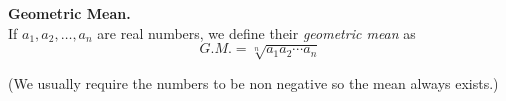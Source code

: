 \documentclass[12pt]{article}
\begin{document}
\textbf{Geometric Mean.}\\
If  $a_1,a_2,\ldots,a_n$ are real numbers, we define their \emph{geometric mean} as
$$G.M. =\sqrt[n]{a_1a_2\cdots a_n}$$
\bigskip

{\footnotesize
(We usually require the numbers to be non negative so the mean always exists.)
}
\end{document}
